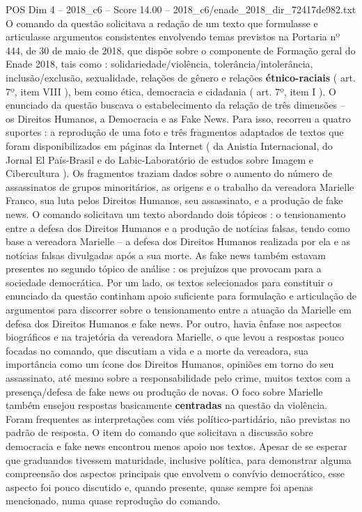 \begin{textsample}{POS Dim 4 – 2018\_c6 – Score 14.00 – 2018\_c6/enade\_2018\_dir\_72417de982.txt}
O comando da questão solicitava a redação de um texto que formulasse e articulasse argumentos consistentes envolvendo temas previstos na Portaria nº 444, de 30 de maio de 2018, que dispõe sobre o componente de Formação geral do Enade 2018, tais como : solidariedade/violência, tolerância/intolerância, inclusão/exclusão, sexualidade, relações de gênero e relações \textbf{étnico-raciais} ( art. 7º, item VIII ), bem como ética, democracia e cidadania ( art. 7º, item I ).
O enunciado da questão buscava o estabelecimento da relação de três dimensões – os Direitos Humanos, a Democracia e as Fake News.
Para isso, recorreu a quatro suportes : a reprodução de uma foto e três fragmentos adaptados de textos que foram disponibilizados em páginas da Internet ( da Anistia Internacional, do Jornal El País-Brasil e do Labic-Laboratório de estudos sobre Imagem e Cibercultura ).
Os fragmentos traziam dados sobre o aumento do número de assassinatos de grupos minoritários, as origens e o trabalho da vereadora Marielle Franco, sua luta pelos Direitos Humanos, seu assassinato, e a produção de fake news.
O comando solicitava um texto abordando dois tópicos : o tensionamento entre a defesa dos Direitos Humanos e a produção de notícias falsas, tendo como base a vereadora Marielle – a defesa dos Direitos Humanos realizada por ela e as notícias falsas divulgadas após a sua morte.
As fake news também estavam presentes no segundo tópico de análise : os prejuízos que provocam para a sociedade democrática.
Por um lado, os textos selecionados para constituir o enunciado da questão continham apoio suficiente para formulação e articulação de argumentos para discorrer sobre o tensionamento entre a atuação da Marielle em defesa dos Direitos Humanos e fake news.
Por outro, havia ênfase nos aspectos biográficos e na trajetória da vereadora Marielle, o que levou a respostas pouco focadas no comando, que discutiam a vida e a morte da vereadora, sua importância como um ícone dos Direitos Humanos, opiniões em torno do seu assassinato, até mesmo sobre a responsabilidade pelo crime, muitos textos com a presença/defesa de fake news ou produção de novas.
O foco sobre Marielle também ensejou respostas basicamente \textbf{centradas} na questão da violência.
Foram frequentes as interpretações com viés político-partidário, não previstas no padrão de resposta.
O item do comando que solicitava a discussão sobre democracia e fake news encontrou menos apoio nos textos.
Apesar de se esperar que graduandos tivessem maturidade, inclusive política, para demonstrar alguma compreensão dos aspectos principais que envolvem o convívio democrático, esse aspecto foi pouco discutido e, quando presente, quase sempre foi apenas mencionado, numa quase reprodução do comando.

\end{textsample}
